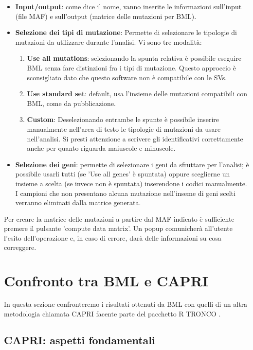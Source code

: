 \documentclass[a4paper]{article}
\begin{document}
	\begin{itemize}
	\item \textbf{Input/output}: come dice il nome, vanno inserite le informazioni sull'input (file MAF) e
	sull'output (matrice delle mutazioni per BML). 
	\item \textbf{Selezione dei tipi di mutazione}: Permette di selezionare le tipologie di mutazioni da utilizzare
	durante l'analisi. Vi sono tre modalità:
	\begin{enumerate}
	\item \textbf{Use all mutations}: selezionando la spunta relativa è possibile eseguire BML senza fare distinzioni fra 
	i tipi di mutazione. Questo approccio è sconsigliato dato che questo software non è compatibile con le SVs.
	\item \textbf{Use standard set}: default, usa l'insieme delle mutazioni compatibili con BML, come da pubblicazione.
	\item \textbf{Custom}: Deselezionando entrambe le spunte è possibile inserire manualmente nell'area di testo
	 le tipologie di mutazioni da usare nell'analisi. Si presti attenzione a scrivere gli identificativi correttamente
	 anche per quanto riguarda maiuscole e minuscole.  
	\end{enumerate}
	\item \textbf{Selezione dei geni}: permette di selezionare i geni da sfruttare per l'analisi; è possibile
	usarli tutti (se 'Use all genes' è spuntata) oppure sceglierne un insieme a scelta (se invece non è spuntata) 
	inserendone i codici manualmente. I campioni che non presentano alcuna mutazione nell'inseme di geni scelti verranno
	eliminati dalla matrice generata.  
	\end{itemize}

	Per creare la matrice delle mutazioni a partire dal MAF indicato è sufficiente premere il pulsante
	'compute data matrix'. Un popup comunicherà all'utente l'esito dell'operazione e, in caso di errore, darà 
	delle informazioni su cosa correggere. 

	\section{\LARGE Confronto tra BML e CAPRI}

	In questa sezione confronteremo i risultati ottenuti da BML con quelli di un altra metodologia chiamata CAPRI \cite{CAPRI} facente 
	parte del pacchetto R TRONCO \cite{TRONCO}. 

	\subsection{\large CAPRI: aspetti fondamentali}	
\end{document}
